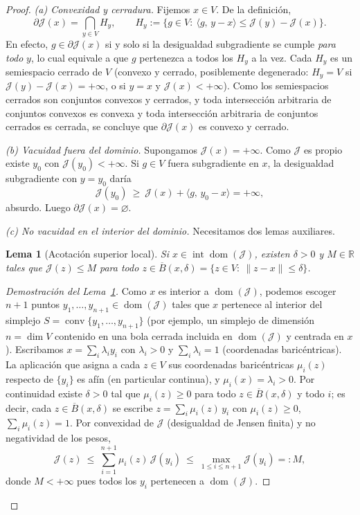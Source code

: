 \documentclass[12pt]{book}
\theoremstyle{definition}
\theoremstyle{plain}
\newtheorem{lema}{Lema}[section]
\theoremstyle{remark}
\begin{document}
\begin{proof}
\emph{(a) Convexidad y cerradura.}
Fijemos $x\in V$. De la definici\'on,
\[
\partial\mathcal{J}(x)=\bigcap_{y\in V} H_y,
\qquad
H_y:=\bigl\{g\in V:\ \langle g,\,y-x\rangle
\le \mathcal{J}(y)-\mathcal{J}(x)\bigr\}.
\]
En efecto, $g\in\partial\mathcal{J}(x)$ si y solo si la desigualdad
subgradiente se cumple \emph{para todo} $y$, lo cual equivale a que $g$
pertenezca a todos los $H_y$ a la vez. Cada $H_y$ es un semiespacio
cerrado de $V$ (convexo y cerrado, posiblemente degenerado:
$H_y=V$ si $\mathcal{J}(y)-\mathcal{J}(x)=+\infty$, o si $y=x$ y
$\mathcal{J}(x)<+\infty$). Como los semiespacios cerrados son conjuntos
convexos y cerrados, y toda intersecci\'on arbitraria de conjuntos
convexos es convexa y toda intersecci\'on arbitraria de conjuntos
cerrados es cerrada, se concluye que $\partial\mathcal{J}(x)$ es convexo
y cerrado.

\smallskip
\emph{(b) Vacuidad fuera del dominio.}
Supongamos $\mathcal{J}(x)=+\infty$. Como $\mathcal{J}$ es propio existe
$y_{0}$ con $\mathcal{J}(y_{0})<+\infty$. Si $g\in V$ fuera subgradiente
en $x$, la desigualdad subgradiente con $y=y_{0}$ dar\'ia
\[
\mathcal{J}(y_{0})\ \ge\
\mathcal{J}(x)+\langle g,\,y_{0}-x\rangle=+\infty,
\]
absurdo. Luego $\partial\mathcal{J}(x)=\varnothing$.

\smallskip
\emph{(c) No vacuidad en el interior del dominio.}
Necesitamos dos lemas auxiliares.

\begin{lema}[Acotaci\'on superior local]
\label{lema:acotacion}
Si $x\in\operatorname{int}\operatorname{dom}(\mathcal{J})$, existen
$\delta>0$ y $M\in\mathbb{R}$ tales que $\mathcal{J}(z)\le M$ para todo
$z\in\overline{B}(x,\delta)=\{z\in V:\ \|z-x\|\le\delta\}$.
\end{lema}

\begin{proof}[Demostraci\'on del Lema~\ref{lema:acotacion}]
Como $x$ es interior a $\operatorname{dom}(\mathcal{J})$, podemos
escoger $n+1$ puntos $y_{1},\dots,y_{n+1}\in
\operatorname{dom}(\mathcal{J})$ tales que $x$ pertenece al interior del
simplejo $S=\operatorname{conv}\{y_{1},\dots,y_{n+1}\}$ (por ejemplo, un
simplejo de dimensi\'on $n=\dim V$ contenido en una bola cerrada
incluida en $\operatorname{dom}(\mathcal{J})$ y centrada en $x$).
Escribamos $x=\sum_{i}\lambda_{i}y_{i}$ con $\lambda_{i}>0$ y
$\sum_{i}\lambda_{i}=1$ (coordenadas baric\'entricas). La aplicaci\'on
que asigna a cada $z\in V$ sus coordenadas baric\'entricas $\mu_{i}(z)$
respecto de $\{y_{i}\}$ es af\'in (en particular continua), y
$\mu_{i}(x)=\lambda_{i}>0$. Por continuidad existe $\delta>0$ tal que
$\mu_{i}(z)\ge 0$ para todo $z\in\overline{B}(x,\delta)$ y todo $i$; es
decir, cada $z\in\overline{B}(x,\delta)$ se escribe
$z=\sum_{i}\mu_{i}(z)\,y_{i}$ con $\mu_{i}(z)\ge0$,
$\sum_{i}\mu_{i}(z)=1$. Por convexidad de $\mathcal{J}$ (desigualdad de
Jensen finita) y no negatividad de los pesos,
\[
\mathcal{J}(z)\ \le\
\sum_{i=1}^{n+1}\mu_{i}(z)\,\mathcal{J}(y_{i})
\ \le\ \max_{1\le i\le n+1} \mathcal{J}(y_{i})=:M ,
\]
donde $M<+\infty$ pues todos los $y_{i}$ pertenecen a
$\operatorname{dom}(\mathcal{J})$.
\end{proof}


\end{proof}
\end{document}
